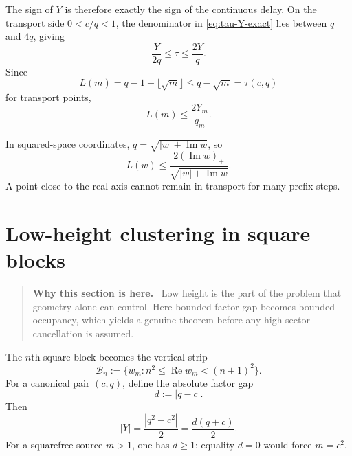 \documentclass[11pt]{article}
\theoremstyle{definition}
\theoremstyle{remark}
\newcommand{\1}{\mathbf{1}}
\newcommand{\Repart}{\operatorname{Re}}
\newcommand{\Impart}{\operatorname{Im}}
\newenvironment{motivation}
  {\begin{quote}\small\color{ovvogray}\textbf{Why this section is here.}\ }
  {\end{quote}}
\begin{document}
The sign of $Y$ is therefore exactly the sign of the continuous delay.  On the transport side $0<c/q<1$, the denominator in \cref{eq:tau-Y-exact} lies between $q$ and $4q$, giving
\begin{equation}
 \frac{Y}{2q}
 \le\tau
 \le\frac{2Y}{q}.
 \label{eq:tau-bounds}
\end{equation}
Since
\begin{equation}
 L(m)=q-1-\lfloor\sqrt m\rfloor
 \le q-\sqrt m=\tau(c,q)
 \label{eq:L-tau}
\end{equation}
for transport points,
\begin{equation}
 \boxed{L(m)\le\frac{2Y_m}{q_m}.}
 \label{eq:L-Y}
\end{equation}

In squared-space coordinates, $q=\sqrt{|w|+\Impart w}$, so
\begin{equation}
 L(w)
 \le
 \frac{2(\Impart w)_+}
 {\sqrt{|w|+\Impart w}}.
 \label{eq:L-w}
\end{equation}
A point close to the real axis cannot remain in transport for many prefix steps.

\section{Low-height clustering in square blocks}
\label{sec:clustering}

\begin{motivation}
Low height is the part of the problem that geometry alone can control.  Here bounded factor gap becomes bounded occupancy, which yields a genuine theorem before any high-sector cancellation is assumed.
\end{motivation}

The $n$th square block becomes the vertical strip
\begin{equation}
 \mathscr B_n
 :=\{w_m:n^2\le\Repart w_m<(n+1)^2\}.
 \label{eq:complex-block}
\end{equation}
For a canonical pair $(c,q)$, define the absolute factor gap
\begin{equation}
 d:=|q-c|.
 \label{eq:absolute-gap}
\end{equation}
Then
\begin{equation}
 |Y|
 =\frac{|q^2-c^2|}{2}
 =\frac{d(q+c)}{2}.
 \label{eq:Y-absolute-gap}
\end{equation}
For a squarefree source $m>1$, one has $d\ge1$: equality $d=0$ would
force $m=c^2$.
\end{document}
